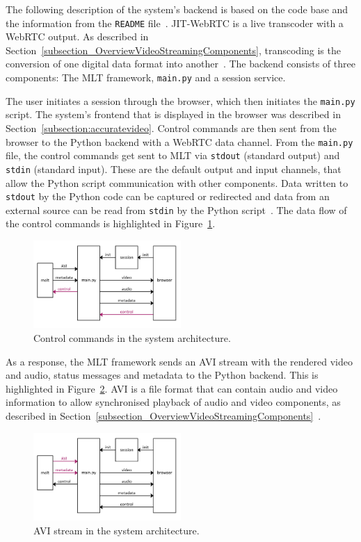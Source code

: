 \documentclass[../MasterThesis.tex]{subfiles}
\begin{document}
The following description of the system's backend is based on the code base and the information from the \texttt{README} file~\cite{RM_Backend}.
JIT-WebRTC is a live transcoder with a WebRTC output. As described in Section~\ref{subsection_OverviewVideoStreamingComponents}, transcoding is the conversion of one digital data format into another~\cite{transcoding}.
The backend consists of three components: The MLT framework, \texttt{main.py} and a session service.


The user initiates a session through the browser, which then initiates the \texttt{main.py} script. The system's frontend that is displayed in the browser was described in Section~\ref{subsection:accuratevideo}.
Control commands are then sent from the browser to the Python backend with a WebRTC data channel.
From the \texttt{main.py} file, the control commands get sent to MLT via \texttt{stdout} (standard output) and \texttt{stdin} (standard input). These are the default output and input channels, that allow the Python script communication with other components.
Data written to \texttt{stdout} by the Python code can be captured or redirected and data from an external source can be read from \texttt{stdin} by the Python script~\cite{python}. The data flow of the control commands is highlighted in Figure~\ref{figure:controlcommands}.

\begin{figure}[H]
	\centering
	\includegraphics[width=0.5\textwidth]{IM_control.png}
	\caption{Control commands in the system architecture.}
	\label{figure:controlcommands}
\end{figure}


As a response, the MLT framework sends an AVI stream with the rendered video and audio, status messages and metadata to the Python backend. This is highlighted in Figure~\ref{figure:avimetadata}.
AVI is a file format that can contain audio and video information to allow synchronised playback of audio and video components, as described in Section~\ref{subsection_OverviewVideoStreamingComponents}~\cite{avi}. 

\begin{figure}[H]
	\centering
	\includegraphics[width=0.5\textwidth]{IM_avi.png}
	\caption{AVI stream in the system architecture.}
	\label{figure:avimetadata}
\end{figure}
\end{document}
